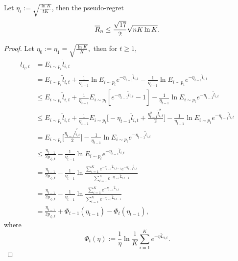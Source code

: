 \begin{thm}
    Let $\eta_t:=\sqrt{\frac{\ln K}{tK}}$, then the pseudo-regret
    \begin{equation}
        {\overline{R}}_n\le \frac{\sqrt{17}}{2}\sqrt{nK\ln K}.
    \end{equation}
\end{thm}
\begin{proof}
    Let $\eta_0:=\eta_1=\sqrt{\frac{\ln K}{K}},$
    then for $t\ge1$,
    \begin{align}
        l_{I_t,t}
            &= E_{i\sim p_t}\tilde l_{i,t} \\
            &= E_{i\sim p_t}\tilde l_{i,t}
                +\frac{1}{\eta_{t-1}}\ln E_{i\sim p_t}e^{-\eta_{t-1}\tilde l_{i,t}}
                -\frac{1}{\eta_{t-1}}\ln E_{i\sim p_t}e^{-\eta_{t-1}\tilde l_{i,t}}\\
            &\le  E_{i\sim p_t}\tilde l_{i,t}
                +\frac{1}{\eta_{t-1}} E_{i\sim p_t}[e^{-\eta_{t-1}\tilde l_{i,t}} - 1]
                -\frac{1}{\eta_{t-1}}\ln E_{i\sim p_t}e^{-\eta_{t-1}\tilde l_{i,t}}\\
            &\le E_{i\sim p_t}\tilde l_{i,t}
                +\frac{1}{\eta_{t-1}} E_{i\sim p_t}\bigg[-\eta_{t-1}\tilde l_{i,t}+\frac{\eta_{t-1}^2\tilde l_{i,t}^2}{2}\bigg]
                -\frac{1}{\eta_{t-1}}\ln E_{i\sim p_t}e^{-\eta_{t-1}\tilde l_{i,t}}\\
            &= E_{i\sim p_t}\bigg[\frac{\eta_{t-1}\tilde l_{i,t}^2}{2}\bigg]
                -\frac{1}{\eta_{t-1}}\ln E_{i\sim p_t}e^{-\eta_{t-1}\tilde l_{i,t}}\\
            &\le \frac{\eta_{t-1}}{2p_{I_t,t}}
                -\frac{1}{\eta_{t-1}}\ln E_{i\sim p_t}e^{-\eta_{t-1}\tilde l_{i,t}}\\
            &= \frac{\eta_{t-1}}{2p_{I_t,t}}
                -\frac{1}{\eta_{t-1}}\ln \frac{\sum_{i=1}^K e^{-\eta_{t-1}\tilde L_{i,t-1}}e^{-\eta_{t-1}\tilde l_{i,t}}}{\sum_{i=1}^K e^{-\eta_{t-1}\tilde L_{i,t-1}}} \\
            &= \frac{\eta_{t-1}}{2p_{I_t,t}}
                -\frac{1}{\eta_{t-1}}\ln \frac{\sum_{i=1}^K e^{-\eta_{t-1}\tilde L_{i,t}}}{\sum_{i=1}^K e^{-\eta_{t-1}\tilde L_{i,t-1}}} \\
            &= \frac{\eta_{t-1}}{2p_{I_t,t}} + \Phi_{t-1}(\eta_{t-1}) - \Phi_t(\eta_{t-1}),
    \end{align}
    where
    \begin{equation}
        \Phi_t(\eta):= \frac{1}{\eta}\ln\frac{1}{K} \sum_{i=1}^K e^{-\eta\tilde L_{i,t}}.

\end{equation}
\end{proof}
